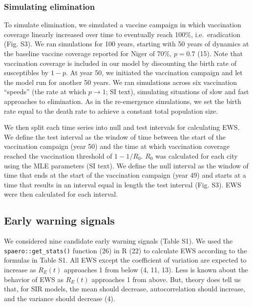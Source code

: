 \documentclass[3p]{elsarticle} %
\begin{document}
\subsubsection{Simulating elimination}\label{simulating-elimination}

To simulate elimination, we simulated a vaccine campaign in which
vaccination coverage linearly increased over time to eventually reach
100\%, i.e.~eradication (Fig. S3). We ran simulations for 100 years,
starting with 50 years of dynamics at the baseline vaccine coverage
reported for Niger of 70\%, \(p = 0.7\) (15). Note that vaccination
coverage is included in our model by discounting the birth rate of
susceptibles by \(1-p\). At year 50, we initiated the vaccination
campaign and let the model run for another 50 years. We ran simulations
across six vaccination ``speeds'' (the rate at which
\(p \rightarrow 1\); SI text), simulating situations of slow and fast
approaches to elimination. As in the re-emergence simulations, we set
the birth rate equal to the death rate to achieve a constant total
population size.

We then split each time series into null and test intervals for
calculating EWS. We define the test interval as the window of time
between the start of the vaccination campaign (year 50) and the time at
which vaccination coverage reached the vaccination threshold of
\(1 - 1/R_0\). \(R_0\) was calculated for each city using the MLE
parameters (SI text). We define the null interval as the window of time
that ends at the start of the vaccination campaign (year 49) and starts
at a time that results in an interval equal in length the test interval
(Fig. S3). EWS were then calculated for each interval.

\subsection{Early warning signals}\label{early-warning-signals}

We considered nine candidate early warning signals (Table S1). We used
the \texttt{spaero::get\_stats()} function (26) in R (22) to calculate
EWS according to the formulas in Table S1. All EWS except the
coefficient of variation are expected to increase as \(R_E(t)\)
approaches 1 from below (4, 11, 13). Less is known about the behavior of
EWS as \(R_E(t)\) approaches 1 from above. But, theory does tell us
that, for SIR models, the mean should decrease, autocorrelation should
increase, and the variance should decrease (4).
\end{document}
